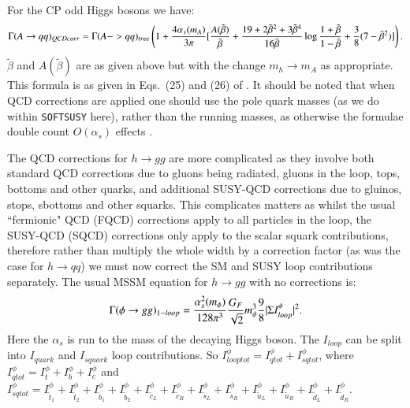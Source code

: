 \documentclass[final,3p,times]{elsarticle}
\begin{document}
For the CP odd Higgs bosons we have:
\begin{equation} \label{AqqQCDcorr}
\begin{aligned}
\Gamma(A \rightarrow qq)_{QCDcorr} = \Gamma(A-> qq)_{tree} \left(1 + {4 \alpha_s(m_A) \over 3 \pi} [{A(\tilde{\beta}) \over \tilde{\beta}} + {19 + 2 \tilde{\beta}^2 + 3 \tilde{\beta}^4 \over 16 \tilde{\beta}} \log{1+\tilde{\beta} \over 1 - \tilde{\beta}} + {3 \over 8} (7 - \tilde{\beta}^2 )]\right).
\end{aligned}
\end{equation}
$\tilde{\beta}$ and $A(\tilde{\beta})$ are as given above but with the change $m_h \rightarrow m_A$ as appropriate.
This formula is as given in Eqs.~(25) and (26) of \cite{Spira:2016}. It should be noted that when QCD corrections are applied one should use the pole quark masses (as we do within {\tt SOFTSUSY} here), rather than the running masses, as otherwise the formulae double count $O(\alpha_s)$ effects \cite{Drees:1990,Kataev:1993be}. 

The QCD corrections for $h \rightarrow gg$ are more complicated as they involve both standard QCD corrections due to gluons being radiated, gluons in the loop, tops, bottoms and other quarks, and additional SUSY-QCD corrections due to gluinos, stops, sbottoms and other squarks. This complicates matters as whilst the usual ``fermionic" QCD (FQCD) corrections  apply to all particles in the loop, the SUSY-QCD (SQCD) corrections only apply to the scalar squark contributions, therefore rather than multiply the whole width by a correction factor (as was the case for $h \rightarrow qq$) we must now correct the SM and SUSY loop contributions separately.
The usual MSSM equation for $h \rightarrow gg$ with no corrections is:
\begin{equation} \label{phiggnorm}
\Gamma(\phi \rightarrow gg)_{1-loop} = {\alpha_{s}^2 (m_\phi) \over 128 \pi^3} {G_{F} \over \sqrt{2}} m_{\phi}^3{9 \over 8}|\Sigma I_{loop}^\phi|^2.
\end{equation}
Here the $\alpha_s$ is run to the mass of the decaying Higgs boson.
The $I_{loop}$ can be split into $I_{quark}$ and $I_{squark}$ loop contributions.
So $I_{looptot}^\phi = I_{qtot}^\phi + I_{sqtot}^\phi$, where $I_{qtot}^\phi = I_t^\phi + I_b^\phi + I_c^\phi$ and $I_{sqtot}^\phi = I_{\tilde{t}_1}^\phi + I_{\tilde{t}_2}^\phi + I_{\tilde{b}_1}^\phi + I_{\tilde{b}_2}^\phi + I_{\tilde{c}_L}^\phi + I_{\tilde{c}_R}^\phi + I_{\tilde{s}_L}^\phi + I_{\tilde{s}_R}^\phi + I_{\tilde{u}_L}^\phi + I_{\tilde{u}_R}^\phi + I_{\tilde{d}_L}^\phi + I_{\tilde{d}_R}^\phi$.
\end{document}
